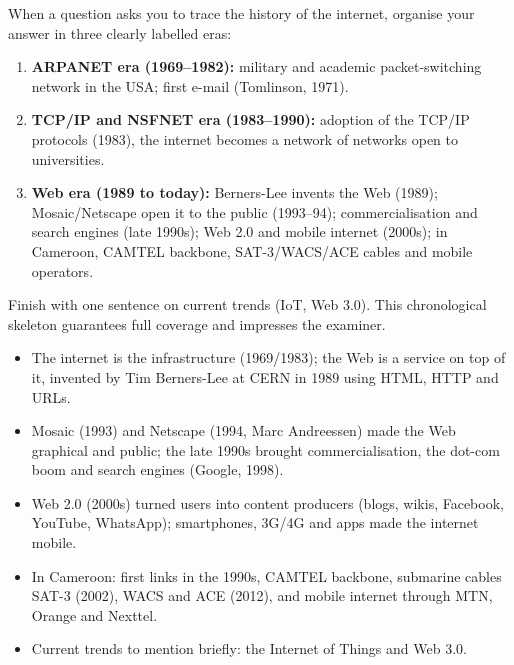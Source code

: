 \documentclass[11pt]{article}
\newcommand{\cle}[1]{{\popxbold\color{popdark}#1}}
\begin{document}
\begin{methode}
When a question asks you to trace the history of the internet, organise your answer in three clearly labelled eras:
\begin{enumerate}
\item \textbf{ARPANET era (1969--1982):} military and academic packet-switching network in the USA; first e-mail (Tomlinson, 1971).
\item \textbf{TCP/IP and NSFNET era (1983--1990):} adoption of the TCP/IP protocols (1983), the internet becomes a network of networks open to universities.
\item \textbf{Web era (1989 to today):} Berners-Lee invents the Web (1989); Mosaic/Netscape open it to the public (1993--94); commercialisation and search engines (late 1990s); Web 2.0 and mobile internet (2000s); in Cameroon, CAMTEL backbone, SAT-3/WACS/ACE cables and mobile operators.
\end{enumerate}
Finish with one sentence on current trends (IoT, Web 3.0). This chronological skeleton guarantees full coverage and impresses the examiner.
\end{methode}

\begin{aretenir}
\begin{itemize}
\item The \cle{internet} is the infrastructure (1969/1983); the \cle{Web} is a service on top of it, invented by \cle{Tim Berners-Lee} at CERN in \cle{1989} using HTML, HTTP and URLs.
\item \cle{Mosaic} (1993) and \cle{Netscape} (1994, Marc Andreessen) made the Web graphical and public; the late 1990s brought commercialisation, the dot-com boom and search engines (Google, 1998).
\item \cle{Web 2.0} (2000s) turned users into content producers (blogs, wikis, Facebook, YouTube, WhatsApp); smartphones, 3G/4G and apps made the internet mobile.
\item In Cameroon: first links in the 1990s, CAMTEL backbone, submarine cables SAT-3 (2002), WACS and ACE (2012), and mobile internet through MTN, Orange and Nexttel.
\item Current trends to mention briefly: the Internet of Things and Web 3.0.
\end{itemize}
\end{aretenir}
\end{document}
